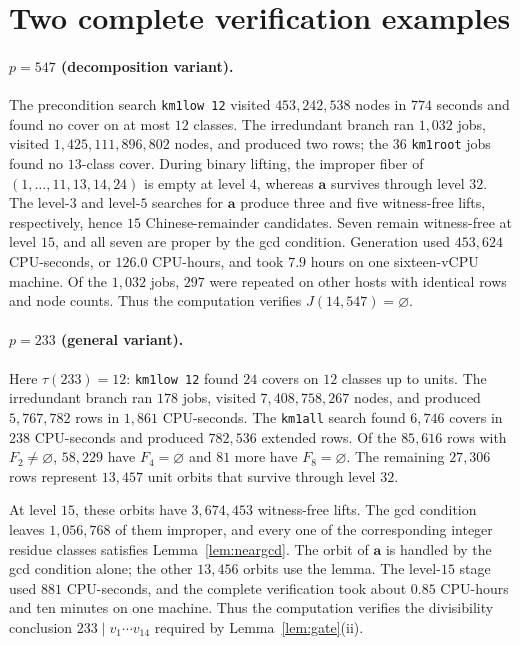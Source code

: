 \documentclass[11pt]{article}
\theoremstyle{definition}
\theoremstyle{remark}
\newcommand{\vct}[1]{\mathbf{#1}}
\begin{document}
\appendix

\section{Two complete verification examples}\label{app:examples}

\paragraph{$p=547$ (decomposition variant).}
The precondition search \texttt{km1low 12} visited $453{,}242{,}538$ nodes
in $774$ seconds and found no cover on at most $12$ classes.  The
irredundant branch ran $1{,}032$ jobs, visited
$1{,}425{,}111{,}896{,}802$ nodes, and produced two rows; the $36$
\texttt{km1root} jobs found no $13$-class cover.  During binary lifting,
the improper fiber of $(1,\ldots,11,13,14,24)$ is empty at level $4$,
whereas $\vct{a}$ survives through level $32$.  The level-$3$ and level-$5$
searches for $\vct{a}$ produce three and five witness-free lifts,
respectively, hence $15$ Chinese-remainder candidates.  Seven remain
witness-free at level $15$, and all seven are proper by the gcd condition.
Generation used $453{,}624$ CPU-seconds, or $126.0$ CPU-hours, and took
$7.9$ hours on one sixteen-vCPU machine.  Of the $1{,}032$ jobs, $297$
were repeated on other hosts with identical rows and node counts.  Thus
the computation verifies $J(14,547)=\varnothing$.

\paragraph{$p=233$ (general variant).}
Here $\tau(233)=12$: \texttt{km1low 12} found $24$ covers on $12$ classes
up to units.  The irredundant branch ran $178$ jobs, visited
$7{,}408{,}758{,}267$ nodes, and produced $5{,}767{,}782$ rows in $1{,}861$
CPU-seconds.  The \texttt{km1all} search found $6{,}746$ covers in $238$
CPU-seconds and produced $782{,}536$ extended rows.  Of the $85{,}616$ rows
with $F_2\neq\varnothing$, $58{,}229$ have $F_4=\varnothing$ and $81$ more
have $F_8=\varnothing$.  The remaining $27{,}306$ rows represent
$13{,}457$ unit orbits that survive through level $32$.

At level $15$, these orbits have $3{,}674{,}453$ witness-free lifts.
The gcd condition leaves $1{,}056{,}768$ of them improper, and every one
of the corresponding integer residue classes satisfies
Lemma~\ref{lem:neargcd}.  The orbit of $\vct{a}$ is handled by the gcd
condition alone; the other $13{,}456$ orbits use the lemma.  The
level-$15$ stage used $881$ CPU-seconds, and the complete verification took
about $0.85$ CPU-hours and ten minutes on one machine.  Thus the computation
verifies the divisibility conclusion $233\mid v_1\cdots v_{14}$ required
by Lemma~\ref{lem:gate}(ii).
\end{document}
